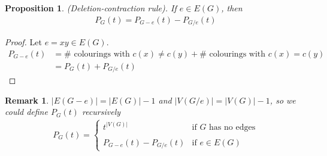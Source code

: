 \documentclass[a4paper]{article}
\theoremstyle{plain}
\newtheorem{proposition}[lemma]{Proposition}
\theoremstyle{myremark}
\newtheorem{remark}[lemma]{Remark}
\begin{document}
\begin{proposition}
(Deletion-contraction rule). If $e\in E(G)$, then
\begin{align*}
P_G(t)=P_{G-e}(t)-P_{G/e}(t)
\end{align*}
\end{proposition}
\begin{proof}
Let $e=xy\in E(G)$.
\begin{align*}
P_{G-e}(t)&=\#\text{ colourings with } c(x)\neq c(y) + \# \text{ colourings with } c(x)=c(y) \\
&= P_G(t)+P_{G/e}(t)
\end{align*}
\end{proof}
\begin{remark}
$|E(G-e)|=|E(G)|-1$ and $|V(G/e)|=|V(G)|-1$, so we could define $P_G(t)$ recursively
\begin{align*}
P_G(t) = \left\lbrace \begin{array}{ll}
t^{|V(G)|} & \text{if } G \text{ has no edges}\\
 & \\
P_{G-e}(t)-P_{G/e}(t) & \text{if } e\in E(G)
\end{array} \right.
\end{align*}
\end{remark}
\end{document}
